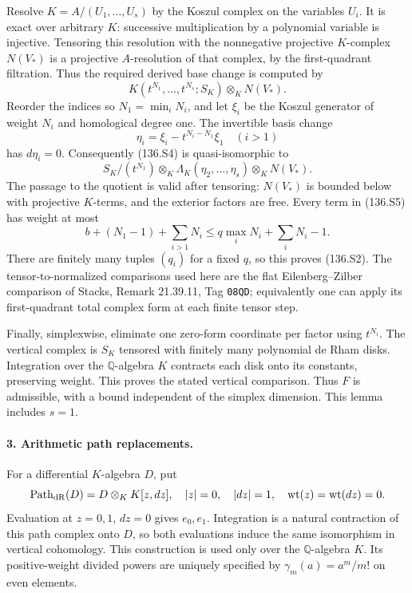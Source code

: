 Resolve $K=A/(U_1,\ldots,U_s)$ by the Koszul complex
on the variables $U_i$. It is exact over arbitrary
$K$: successive multiplication by a polynomial variable
is injective. Tensoring this resolution with the
nonnegative projective $K$-complex $N(V_*)$ is a
projective $A$-resolution of that complex, by the
first-quadrant filtration. Thus the required derived
base change is computed by
\[
           K(t^{N_1},\ldots,t^{N_s};S_K)
                               \otimes_K N(V_*).         \tag{136.S4}
\]
Reorder the indices so $N_1=\min_iN_i$, and let $\xi_i$
be the Koszul generator of weight $N_i$ and homological
degree one. The invertible basis change
\[
        \eta_i=\xi_i-t^{N_i-N_1}\xi_1\quad(i>1)
\]
has $d\eta_i=0$. Consequently (136.S4) is
quasi-isomorphic to
\[
  S_K/(t^{N_1})\otimes_K
       \Lambda_K(\eta_2,\ldots,\eta_s)\otimes_K N(V_*).
                                                               \tag{136.S5}
\]
The passage to the quotient is valid after tensoring:
$N(V_*)$ is bounded below with projective $K$-terms,
and the exterior factors are free. Every term in
(136.S5) has weight at most
\[
       b+(N_1-1)+\sum_{i>1}N_i
                    \le q\max_iN_i+\sum_iN_i-1.
\]
There are finitely many tuples $(q_i)$ for a fixed $q$,
so this proves (136.S2). The tensor-to-normalized
comparisons used here are the flat Eilenberg--Zilber
comparison of Stacks, Remark 21.39.11, Tag \texttt{08QD};
equivalently one can apply its first-quadrant total
complex form at each finite tensor step.

Finally, simplexwise, eliminate one zero-form coordinate
per factor using $t^{N_i}$. The vertical complex is
$S_K$ tensored with finitely many polynomial de Rham
disks. Integration over the $\mathbb Q$-algebra $K$
contracts each disk onto its constants, preserving
weight. This proves the stated vertical comparison.
Thus $F$ is admissible, with a bound independent of
the simplex dimension. This lemma includes $s=1$.

\paragraph{3. Arithmetic path replacements.}
For a differential $K$-algebra $D$, put
\[
 \operatorname{Path}_{\rm dR}(D)=D\otimes_K K[z,dz],
 \quad |z|=0,\quad |dz|=1,\quad\operatorname{wt}(z)
                  =\operatorname{wt}(dz)=0.
\]
Evaluation at $z=0,1$, $dz=0$ gives $e_0,e_1$.
Integration is a natural contraction of this path
complex onto $D$, so both evaluations induce the
same isomorphism in vertical cohomology. This
construction is used only over the $\mathbb Q$-algebra
$K$. Its positive-weight divided powers are uniquely
specified by $\gamma_m(a)=a^m/m!$ on even elements.

